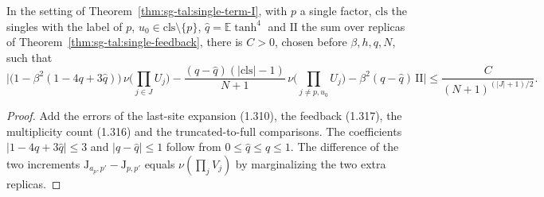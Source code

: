 \begin{theorem}
\label{thm:sg-tal:single-recurrence}
\leanok
{}
In the setting of Theorem~\ref{thm:sg-tal:single-term-I}, with $p$ a single factor, $\mathrm{cls}$ the
singles with the label of $p$, $u_0\in\mathrm{cls}\setminus\{p\}$, $\hat q=\mathbb E\tanh^4$ and
$\mathrm{II}$ the sum over replicas of Theorem~\ref{thm:sg-tal:single-feedback}, there is $C>0$,
chosen before $\beta,h,q,N$, such that
\[
 \Big|\big(1-\beta^2(1-4q+3\hat q)\big)\,\nu\Big(\prod_{j\in J}U_j\Big)
 -\frac{(q-\hat q)(|\mathrm{cls}|-1)}{N+1}\,\nu\Big(\prod_{j\ne p,u_0}U_j\Big)
 -\beta^2(q-\hat q)\,\mathrm{II}\Big|\le\frac{C}{(N+1)^{(|J|+1)/2}}.
\]
\end{theorem}
\begin{proof}
\leanok
Add the errors of the last-site expansion (1.310), the feedback (1.317), the multiplicity count
(1.316) and the truncated-to-full comparisons. The coefficients $|1-4q+3\hat q|\le3$ and
$|q-\hat q|\le1$ follow from $0\le\hat q\le q\le1$. The difference of the two increments
$\mathrm J_{a_p,p'}-\mathrm J_{p,p'}$ equals $\nu(\prod_jV_j)$ by marginalizing the two extra replicas.
\end{proof}

